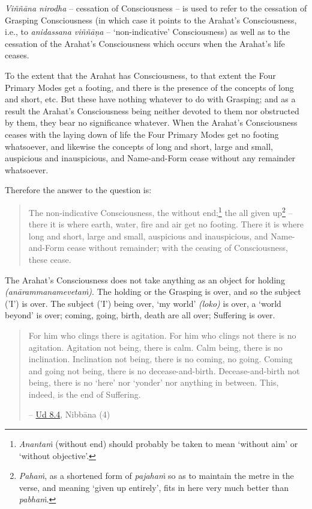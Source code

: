 \emph{Viññāna nirodha} -- cessation of Consciousness -- is used to refer to the cessation of Grasping Consciousness (in which case it points to the Arahat's Consciousness, i.e., to \emph{anidassana viññāṇa} -- `non-indicative' Consciousness) as well as to the cessation of the Arahat's Consciousness which occurs when the Arahat's life ceases.

To the extent that the Arahat has Consciousness, to that extent the Four Primary Modes get a footing, and there is the presence of the concepts of long and short, etc. But these have nothing whatever to do with Grasping; and as a result the Arahat's Consciousness being neither devoted to them nor obstructed by them, they bear no significance whatever. When the Arahat's Consciousness ceases with the laying down of life the Four Primary Modes get no footing whatsoever, and likewise the concepts of long and short, large and small, auspicious and inauspicious, and Name-and-Form cease without any remainder whatsoever.

\clearpage

Therefore the answer to the question is:

\begin{quote}
The non-indicative Consciousness, the without end;\footnote{\emph{Anantaṁ} (without end) should probably be taken to mean `without aim' or `without objective'.} the all given up\footnote{\emph{Pahaṁ}, as a shortened form of \emph{pajahaṁ} so as to maintain the metre in the verse, and meaning `given up entirely', fits in here very much better than \emph{pabhaṁ}.} -- there it is where earth, water, fire and air get no footing. There it is where long and short, large and small, auspicious and inauspicious, and Name-and-Form cease without remainder; with the ceasing of Consciousness, these cease.
\end{quote}

The Arahat's Consciousness does not take anything as an object for holding \emph{(anārammanamevetaṁ)}. The holding or the Grasping is over, and so the subject ('I') is over. The subject ('I') being over, `my world' \emph{(loko)} is over, a `world beyond' is over; coming, going, birth, death are all over; Suffering is over.

\begin{quote}
For him who clings there is agitation. For him who clings not there is no agitation. Agitation not being, there is calm. Calm being, there is no inclination. Inclination not being, there is no coming, no going. Coming and going not being, there is no decease-and-birth. Decease-and-birth not being, there is no `here' nor `yonder' nor anything in between. This, indeed, is the end of Suffering.

 -- \href{https://suttacentral.net/ud8.4/en/anandajoti}{Ud 8.4}, Nibbāna (4)
\end{quote}

